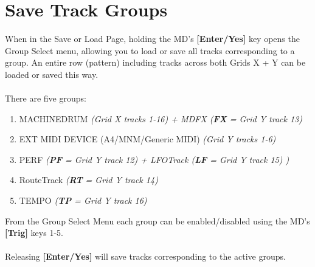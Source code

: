 \section{Save Track Groups}
When in the Save or Load Page, holding the MD's \textbf{[Enter/Yes]} key opens the Group Select menu, allowing you to load or save all tracks corresponding to a group. An entire row (pattern) including tracks across both Grids X + Y can be loaded or saved this way.\\\\
There are five groups:
\begin{enumerate}
    \item MACHINEDRUM \textit{(Grid X tracks 1-16) + MDFX (\textbf{FX} = Grid Y track 13)}
    \item EXT MIDI DEVICE (A4/MNM/Generic MIDI) \textit{(Grid Y tracks 1-6)}
    \item PERF \textit{(\textbf{PF} = Grid Y track 12) + LFOTrack (\textbf{LF }= Grid Y track 15) )}
    \item  RouteTrack \textit{(\textbf{RT} = Grid Y track 14) }
    \item TEMPO \textit{(\textbf{TP} = Grid Y track 16)}
\end{enumerate}
From the Group Select Menu each group can be enabled/disabled using the MD's \textbf{[Trig]} keys 1-5. \\
\\
Releasing \textbf{[Enter/Yes]} will save tracks corresponding to the active groups.


